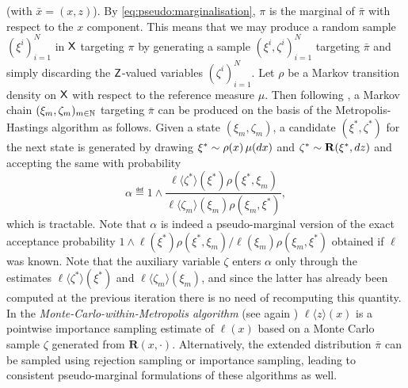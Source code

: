 (with $\bar{x} = (x, z)$). By \eqref{eq:pseudo:marginalisation}, $\pi$ is the marginal of $\bar{\pi}$ with respect to the $x$ component. This means that we may produce a random sample $(\xi^i)_{i = 1}^N$ in $\mathsf{X}$ targeting $\pi$ by generating a sample $(\xi^i, \zeta^i)_{i = 1}^N$ targeting $\bar{\pi}$ and simply discarding the $\mathsf{Z}$-valued variables $(\zeta^i)_{i = 1}^N$. Let $\rho$ be a Markov transition density on $\mathsf{X}$ with respect to the reference measure $\mu$. Then following \cite{andrieu:robert:2009}, a Markov chain $(\xi_m, \zeta_m)_{m \in \mathbb{N}}$ targeting $\bar{\pi}$ can be produced on the basis of the Metropolis-Hastings algorithm as follows. Given a state $(\xi_m, \zeta_m)$, a candidate $(\xi^\ast, \zeta^\ast)$ for the next state is generated by drawing $\xi^\ast \sim \rho(x) \, \mu(d x)$ and $\zeta^\ast \sim \mathbf{R}(\xi^\ast, d z)$ and accepting the same with probability 
$$
\alpha \eqdef 1 \wedge \frac{\ell \langle \zeta^\ast \rangle(\xi^\ast) \rho(\xi^\ast, \xi_m)}{\ell \langle \zeta_m \rangle (\xi_m) \rho(\xi_m, \xi^\ast)},  
$$
which is tractable. Note that $\alpha$ is indeed a pseudo-marginal version of the exact acceptance probability $1 \wedge \ell (\xi^\ast) \rho(\xi^\ast, \xi_m) / \ell (\xi_m) \rho(\xi_m, \xi^\ast)$ obtained if $\ell$ was known. Note that the auxiliary variable $\zeta$ enters $\alpha$ only through the estimates $\ell \langle \zeta^\ast \rangle (\xi^\ast)$ and $\ell \langle \zeta_m \rangle (\xi_m)$, and since the latter has already been computed at the previous iteration there is no need of recomputing this quantity. In the \emph{Monte-Carlo-within-Metropolis algorithm} (see again \cite{andrieu:robert:2009}) $\ell \langle z \rangle(x)$ is a pointwise importance sampling estimate of $\ell(x)$ based on a Monte Carlo sample $\zeta$ generated from $\mathbf{R}(x, \cdot)$. Alternatively, the extended distribution $\bar{\pi}$ can be sampled using rejection sampling or importance sampling, leading to consistent pseudo-marginal formulations of these algorithms as well. 

